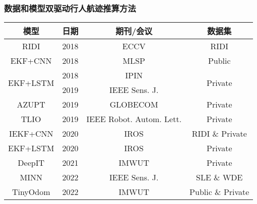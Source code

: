\begin{frame}

	\frametitle{数据和模型双驱动行人航迹推算方法}
	
	{\footnotesize
		\begin{tabular*}{\linewidth}{@{\extracolsep{\fill}}cccc}
			\toprule
			\multicolumn{1}{c}{模型} & 日期 & 期刊/会议 & 数据集 \\
			\midrule
			                     RIDI & 2018 & ECCV                            & RIDI                     \\ %
			                  EKF+CNN & 2018 & MLSP                            & Public                     \\ %
			\multirow{2}{*}{EKF+LSTM} & 2018 & IPIN                            & \multirow{2}{*}{Private} \\ %
			                          & 2019 & IEEE Sens. J.                   &                          \\ %
			                    AZUPT & 2019 & GLOBECOM                        & Private                  \\ %
			                     TLIO & 2019 & IEEE Robot. Autom. Lett.        & Private                  \\ %
			                 IEKF+CNN & 2020 & IROS                            & RIDI \& Private          \\ %
			                 EKF+LSTM & 2020 & IROS                            & Private                  \\ %
			                   DeepIT & 2021 & IMWUT                           & Private                  \\ %
			                     MINN & 2022 & IEEE Sens. J.                   & SLE \& WDE         \\ %
			                 TinyOdom & 2022 & IMWUT                           & Public \& Private         \\ %

\end{tabular*}}
\end{frame}

